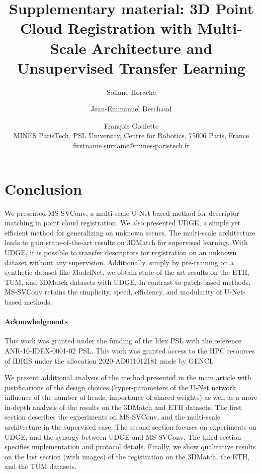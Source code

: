 \documentclass[10pt,twocolumn,letterpaper]{article}
\begin{document}
\section{Conclusion}
We presented MS-SVConv, a multi-scale U-Net based method for descriptor matching in point cloud registration. We also presented UDGE, a simple yet efficient method for generalizing on unknown scenes.
The multi-scale architecture leads to gain state-of-the-art results on 3DMatch for supervised learning. With UDGE, it is possible to transfer descriptors for registration on an unknown dataset without any supervision. Additionally, simply by pre-training on a synthetic dataset like ModelNet, we obtain state-of-the-art results on the ETH, TUM, and 3DMatch datasets with UDGE. In contrast to patch-based methods, 
MS-SVConv retains the simplicity, speed, efficiency, and modularity of U-Net-based methods.
\paragraph{Acknowledgments}
This work was granted under the funding of the Idex PSL with the reference ANR-10-IDEX-0001-02 PSL. This work was granted access to the HPC resources of IDRIS under the allocation 2020-AD011012181 made by GENCI.

{\small


}

\appendix
\title{Supplementary material: 3D Point Cloud Registration with Multi-Scale Architecture and Unsupervised Transfer Learning}
\author{Sofiane Horache
\and Jean-Emmanuel Deschaud 
\and François Goulette\\
MINES ParisTech, PSL University, Centre for Robotics, 75006 Paris, France\\
\small{firstname.surname@mines-paristech.fr}\\
}
\maketitle
We present additional analysis of the method presented in the main article with justifications of the design choices (hyper-parameters of the U-Net network, influence of the number of heads, importance of shared weights) as well as a more in-depth analysis of the results on the 3DMatch and ETH datasets. 
The first section describes the experiments on MS-SVConv, and the multi-scale architecture in the supervised case. The second section focuses on experiments on UDGE, and the synergy between UDGE and MS-SVConv.
The third section specifies implementation and protocol details. 
Finally, we show qualitative results on the last section (with images) of the registration on the 3DMatch, the ETH, and the TUM datasets.\\
\end{document}
